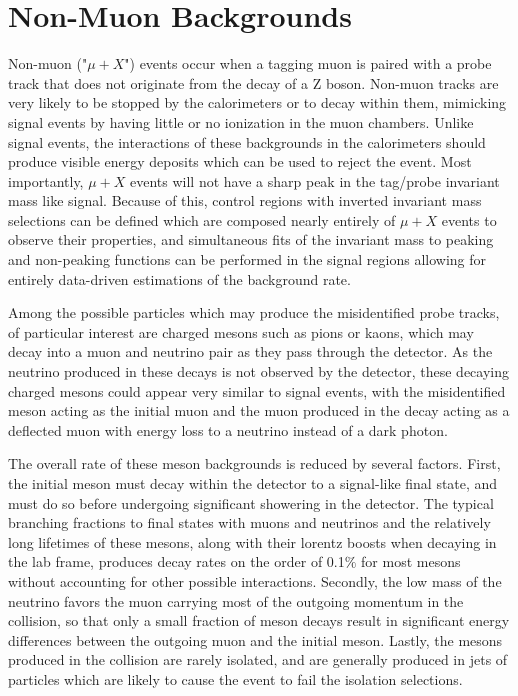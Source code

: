 \section{Non-Muon Backgrounds}
Non-muon ("$\mu+X$") events occur when a tagging muon is paired with a probe track that does not originate from the decay of a Z boson. 
Non-muon tracks are very likely to be stopped by the calorimeters or to decay within them, mimicking signal events by having little or no ionization in the muon chambers. 
Unlike signal events, the interactions of these backgrounds in the calorimeters should produce visible energy deposits which can be used to reject the event.
Most importantly, $\mu+X$ events will not have a sharp peak in the tag/probe invariant mass like signal.
Because of this, control regions with inverted invariant mass selections can be defined which are composed nearly entirely of $\mu+X$ events to observe their properties, and simultaneous fits of the invariant mass to peaking and non-peaking functions can be performed in the signal regions allowing for entirely data-driven estimations of the background rate.

Among the possible particles which may produce the misidentified probe tracks, of particular interest are charged mesons such as pions or kaons, which may decay into a muon and neutrino pair as they pass through the detector.
As the neutrino produced in these decays is not observed by the detector, these decaying charged mesons could appear very similar to signal events, with the misidentified meson acting as the initial muon and the muon produced in the decay acting as a deflected muon with energy loss to a neutrino instead of a dark photon.

The overall rate of these meson backgrounds is reduced by several factors.
First, the initial meson must decay within the detector to a signal-like final state, and must do so before undergoing significant showering in the detector.
The typical branching fractions to final states with muons and neutrinos and the relatively long lifetimes of these mesons, along with their lorentz boosts when decaying in the lab frame, produces decay rates on the order of 0.1$\%$ for most mesons without accounting for other possible interactions.
Secondly, the low mass of the neutrino favors the muon carrying most of the outgoing momentum in the collision, so that only a small fraction of meson decays result in significant energy differences between the outgoing muon and the initial meson.
Lastly, the mesons produced in the collision are rarely isolated, and are generally produced in jets of particles which are likely to cause the event to fail the isolation selections.

